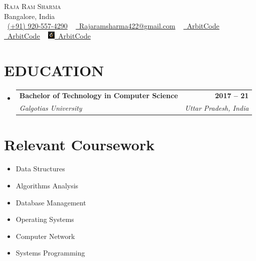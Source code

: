 \documentclass[letterpaper,11pt]{article}
\makeatletter
\newcommand{\resumeSubheading}[4]{
  \vspace{-2pt}\item
    \begin{tabular*}{1.0\textwidth}[t]{l@{\extracolsep{\fill}}r}
      \textbf{#1} & \textbf{\small #2} \\
      \textit{\small#3} & \textit{\small #4} \\
    \end{tabular*}\vspace{-7pt}
}
\newcommand{\resumeSubHeadingListStart}{\begin{itemize}[leftmargin=0.0in, label={}]}
\newcommand{\resumeSubHeadingListEnd}{\end{itemize}}
\makeatother
\begin{document}

\begin{center}
    {\Huge \scshape Raja Ram Sharma} \\ \vspace{1pt}
    Bangalore, India \\ \vspace{1pt}
    \small \raisebox{-0.1\height}\faPhone\ \href{tel:+919205574290}{(+91) 920-557-4290}
    ~ \href{mailto:Rajaramsharma422@gmail.com}{\raisebox{-0.2\height}\faEnvelope\  \underline{Rajaramsharma422@gmail.com}}
    ~ \href{https://linkedin.com/in/ArbitCode}{\raisebox{-0.2\height}\faLinkedin\ \underline{ArbitCode}}
    ~ \href{https://github.com/ArbitCode}{\raisebox{-0.2\height}\faGithub\ \underline{ArbitCode}}
    ~ \href{https://leetcode.com/ArbitCode}{\textbf{\includegraphics[height=10pt, width=10pt]{./img/leetcode.png}}\ \underline{ArbitCode}}
    \vspace{-8pt}
\end{center}


\section{EDUCATION}
  \resumeSubHeadingListStart
    \resumeSubheading
      {Bachelor of Technology in Computer Science}{2017 -- 21}
      {Galgotias University}{Uttar Pradesh, India}
  \resumeSubHeadingListEnd

 \section{Relevant Coursework}
         \begin{multicols}{3}
             \begin{itemize}[itemsep=-5pt, parsep=3pt]
                 \item Data Structures
                 \item Algorithms Analysis
                 \item Database Management
                 \item Operating Systems
                 \item Computer Network
                 \item Systems Programming
             \end{itemize}
        \end{multicols}
\end{document}
